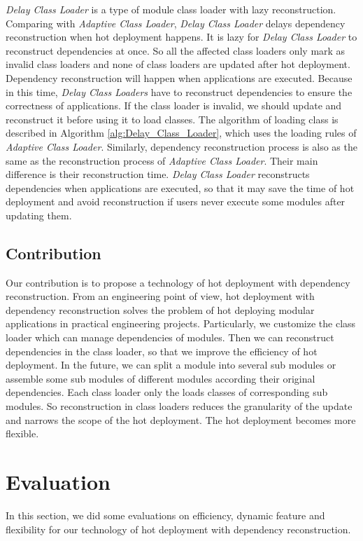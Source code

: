 \documentclass[conference]{IEEEtran}
\begin{document}
\emph{Delay Class Loader} is a type of module class loader with lazy reconstruction.
Comparing with \emph{Adaptive Class Loader}, \emph{Delay Class Loader} delays dependency reconstruction when hot deployment happens.
It is lazy for \emph{Delay Class Loader} to reconstruct dependencies at once. 
So all the affected class loaders only mark as invalid class loaders and none of class loaders are updated after hot deployment.
Dependency reconstruction will happen when applications are executed.
Because in this time, \emph{Delay Class Loaders} have to reconstruct dependencies to ensure the correctness of applications.
If the class loader is invalid, we should update and reconstruct it before using it to load classes. 
The algorithm of loading class is described in Algorithm \ref{alg:Delay_Class_Loader}, which uses the loading rules of \emph{Adaptive Class Loader}.
Similarly, dependency reconstruction process is also as the same as the reconstruction process of \emph{Adaptive Class Loader}.
Their main difference is their reconstruction time.
\emph{Delay Class Loader} reconstructs dependencies when applications are executed, so that it may save the time of hot deployment and avoid reconstruction if users never execute some modules after updating them.

\subsection{Contribution}
Our contribution is to propose a technology of hot deployment with dependency reconstruction.
From an engineering point of view, hot deployment with dependency reconstruction solves the problem of hot deploying modular applications in practical engineering projects.
Particularly, we customize the class loader which can manage dependencies of modules.
Then we can reconstruct dependencies in the class loader, so that we improve the efficiency of hot deployment.
In the future, we can split a module into several sub modules or assemble some sub modules of different modules according their original dependencies.
Each class loader only the loads classes of corresponding sub modules.
So reconstruction in class loaders reduces the granularity of the update and narrows the scope of the hot deployment.
The hot deployment becomes more flexible. 



\section{Evaluation\label{sec:evaluation}}
In this section, we did some evaluations on efficiency, dynamic feature and flexibility for our technology of hot deployment with dependency reconstruction.
\end{document}
